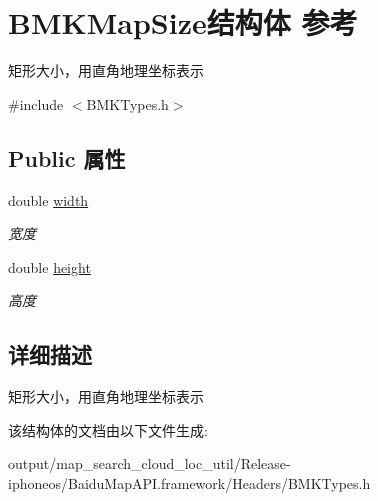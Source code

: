 \hypertarget{struct_b_m_k_map_size}{}\section{B\+M\+K\+Map\+Size结构体 参考}
\label{struct_b_m_k_map_size}


矩形大小，用直角地理坐标表示  




{\ttfamily \#include $<$B\+M\+K\+Types.\+h$>$}

\subsection*{Public 属性}
\begin{DoxyCompactItemize}
\item 
\hypertarget{struct_b_m_k_map_size_a1005d7fd59045a80619c024df3156d6a}{}double \hyperlink{struct_b_m_k_map_size_a1005d7fd59045a80619c024df3156d6a}{width}\label{struct_b_m_k_map_size_a1005d7fd59045a80619c024df3156d6a}

\begin{DoxyCompactList}\small\item\em 宽度 \end{DoxyCompactList}\item 
\hypertarget{struct_b_m_k_map_size_a516baff78187bf8f07ef49f01c7d86fc}{}double \hyperlink{struct_b_m_k_map_size_a516baff78187bf8f07ef49f01c7d86fc}{height}\label{struct_b_m_k_map_size_a516baff78187bf8f07ef49f01c7d86fc}

\begin{DoxyCompactList}\small\item\em 高度 \end{DoxyCompactList}\end{DoxyCompactItemize}


\subsection{详细描述}
矩形大小，用直角地理坐标表示 

该结构体的文档由以下文件生成\+:\begin{DoxyCompactItemize}
\item 
output/map\+\_\+search\+\_\+cloud\+\_\+loc\+\_\+util/\+Release-\/iphoneos/\+Baidu\+Map\+A\+P\+I.\+framework/\+Headers/B\+M\+K\+Types.\+h\end{DoxyCompactItemize}
